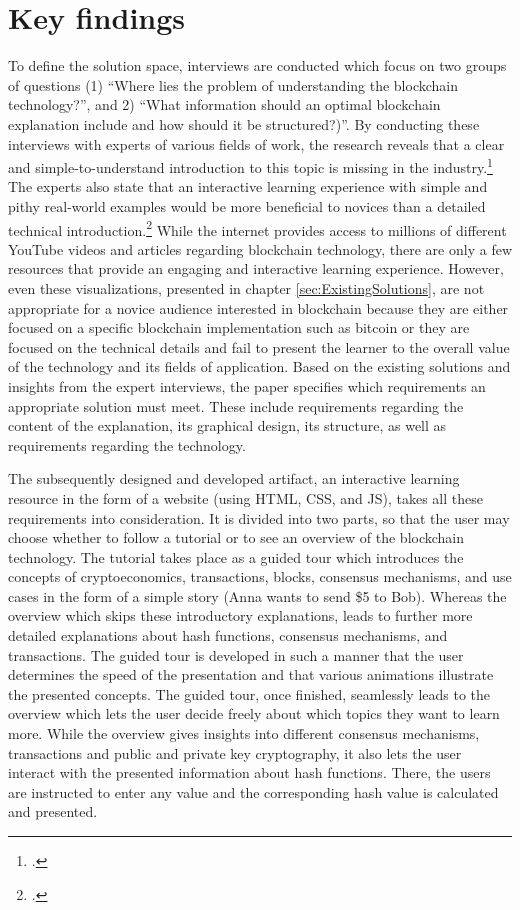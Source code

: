 \section{Key findings}
To define the solution space, interviews are conducted which focus on two groups of questions (1) \enquote{Where lies the problem of understanding the blockchain technology?}, and 2) \enquote{What information should an optimal blockchain explanation include and how should it be structured?)}.
By conducting these interviews with experts of various fields of work, the research reveals that a clear and simple-to-understand introduction to this topic is missing in the industry.\footcite[Cf.][]{DanielKaltenbach_Interview} The experts also state that an interactive learning experience with simple and pithy real-world examples would be more beneficial to novices than a detailed technical introduction.\footcite[Cf.][]{BjoernPaulewicz_Interview} While the internet provides access to millions of different YouTube videos and articles regarding blockchain technology, there are only a few resources that provide an engaging and interactive learning experience. However, even these visualizations, presented in chapter \ref{sec:ExistingSolutions}, are not appropriate for a novice audience interested in blockchain because they are either focused on a specific blockchain implementation such as bitcoin or they are focused on the technical details and fail to present the learner to the overall value of the technology and its fields of application. Based on the existing solutions and insights from the expert interviews, the paper specifies which requirements an appropriate solution must meet. These include requirements regarding the content of the explanation, its graphical design, its structure, as well as requirements regarding the technology.

The subsequently designed and developed artifact, an interactive learning resource in the form of a website (using \ac{HTML}, \ac{CSS}, and \ac{JS}), takes all these requirements into consideration. It is divided into two parts, so that the user may choose whether to follow a tutorial or to see an overview of the blockchain technology. The tutorial takes place as a guided tour which introduces the concepts of cryptoeconomics, transactions, blocks, consensus mechanisms, and use cases in the form of a simple story (Anna wants to send \$5 to Bob). Whereas the overview which skips these introductory explanations, leads to further more detailed explanations about hash functions, consensus mechanisms, and transactions. The guided tour is developed in such a manner that the user determines the speed of the presentation and that various animations illustrate the presented concepts. The guided tour, once finished, seamlessly leads to the overview which lets the user decide freely about which topics they want to learn more. While the overview gives insights into different consensus mechanisms, transactions and public and private key cryptography, it also lets the user interact with the presented information about hash functions. There, the users are instructed to enter any value and the corresponding hash value is calculated and presented.

